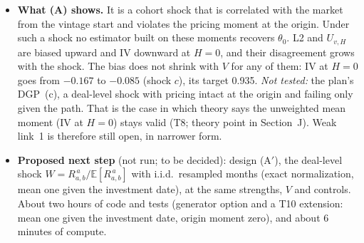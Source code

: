 \documentclass[11pt]{article}
\newcommand{\E}{\mathbb{E}}
\begin{document}
\begin{itemize}
\item \textbf{What (A) shows.} It is a cohort shock that is correlated with the market from the vintage start and violates the pricing moment at the origin. Under such a shock no estimator built on these moments recovers $\theta_0$. L2 and $U_{v,H}$ are biased upward and IV downward at $H=0$, and their disagreement grows with the shock. The bias does not shrink with $V$ for any of them: IV at $H=0$ goes from $-0.167$ to $-0.085$ (shock $c$), its target 0.935. \emph{Not tested:} the plan's DGP~(c), a deal-level shock with pricing intact at the origin and failing only given the path. That is the case in which theory says the unweighted mean moment (IV at $H=0$) stays valid (T8; theory point in Section~J). Weak link~1 is therefore still open, in narrower form.
\item \textbf{Proposed next step} (not run; to be decided): design (A$'$), the deal-level shock $W=R_{a,b}^{\,a}/\E[R_{a,b}^{\,a}]$ with i.i.d.\ resampled months (exact normalization, mean one given the investment date), at the same strengths, $V$ and controls. About two hours of code and tests (generator option and a T10 extension: mean one given the investment date, origin moment zero), and about 6 minutes of compute.
\end{itemize}
\end{document}
